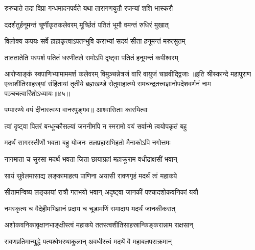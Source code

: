 \twolineshloka
{रुरुचाते तदा विप्रा गन्धमादनपर्वते}
{यथा तारागणयुतौ रजन्यां शशि भास्करौ}%

\twolineshloka
{ददर्शतुर्हनूमन्तं चूर्णीकृतकलेवरम्}
{मूर्च्छितं पतितं भूमौ वमन्तं रुधिरं मुखात्}%

\twolineshloka
{विलोक्य कपयः सर्वे हाहाकृत्वाऽपतन्भुवि}
{कराभ्यां सदयं सीता हनूमन्तं मरुत्सुतम्}%

\twolineshloka
{ताततातेति पस्पर्श पतितं धरणीतले}
{रामोऽपि दृष्ट्वा पतितं हनूमन्तं कपीश्वरम्}%

\twolineshloka
{आरोप्याङ्कं स्वपाणिभ्यामाममर्श कलेवरम्}
{विमुञ्चन्नेत्रजं वारि वायुजं चाव्रवीद्द्विजाः}%
॥इति श्रीस्कान्दे महापुराण एकाशीतिसाहस्र्यां संहितायां तृतीये ब्रह्मखण्डे सेतुमाहात्म्ये रामचन्द्रतत्त्वज्ञानोपदेशवर्णनं नाम पञ्चचत्वारिंशोऽध्यायः॥४५॥


\vakta{}
\shrota{}
\tags{}
\notes{}

\storymeta






\twolineshloka
{पम्पारण्ये वयं दीनास्त्वया वानरपुङ्गव॥}
{आश्वासिताः कारयित्वा}%

\twolineshloka
{त्वां दृष्ट्वा पितरं बन्धून्कौसल्यां जननीमपि}
{न स्मरामो वयं सर्वान्मे त्वयोपकृतं बहु}%

\twolineshloka
{मदर्थं सागरस्तीर्णो भवता बहु योजनः}
{तलप्रहाराभिहतो मैनाकोऽपि नगोत्तमः}%

\twolineshloka
{नागमाता च सुरसा मदर्थं भवता जिता}
{छायाग्रहां महाक्रूराम वधीद्राक्षसीं भवान्}%

\twolineshloka
{सायं सुवेलमासाद्य लङ्कामाहत्य पाणिना}
{अयासी रावणगृहं मदर्थं त्वं महाकपे}%

\twolineshloka
{सीतामन्विष्य लङ्कायां रात्रौ गतभयो भवान्}
{अदृष्ट्वा जानकीं पश्चादशोकवनिकां ययौ}%

\twolineshloka
{नमस्कृत्य च वैदेहीमभिज्ञानं प्रदाय च}
{चूडामणिं समादाय मदर्थं जानकीकरात्}%

\twolineshloka
{अशोकवनिकावृक्षानभाङ्क्षीस्त्वं महाकपे}
{ततस्त्वशीतिसाहस्रान्किङ्करान्नाम राक्षसान्}%

\twolineshloka
{रावणप्रतिमान्युद्धे पत्यश्वेभरथाकुलान्}
{अवधीस्त्वं मदर्थे वै महाबलपराक्रमान्}%

